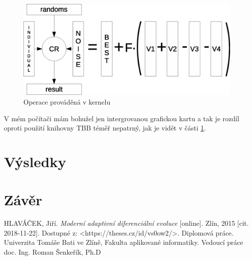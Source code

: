 \documentclass[11pt,a4paper]{scrartcl}
\begin{document}
	\begin{figure}[H]
		\centering
		\includegraphics[width=12cm]{img/opencl-data-diag}
		\caption{Operace prováděná v kernelu}
		\label{fig:kernel}
	\end{figure}

	V mém počítači mám bohužel jen intergrovanou grafickou kartu a tak je rozdíl oproti použití knihovny TBB téměř nepatrný, jak je vidět v části \ref{sec:results}.
	
	\section{Výsledky}
	\label{sec:results}
	
	\section{Závěr}
	
	\begin{thebibliography}{9}
		HLAVÁČEK, Jiří. \textit{Moderní adaptivní diferenciální evoluce} [online]. Zlín, 2015 [cit. 2018-11-22]. Dostupné z: \textless https://theses.cz/id/vs0ow2/\textgreater. Diplomová práce. Univerzita Tomáše Bati ve Zlíně, Fakulta aplikované informatiky. Vedoucí práce doc. Ing. Roman Šenkeřík, Ph.D
	\end{thebibliography}
	
\end{document}
